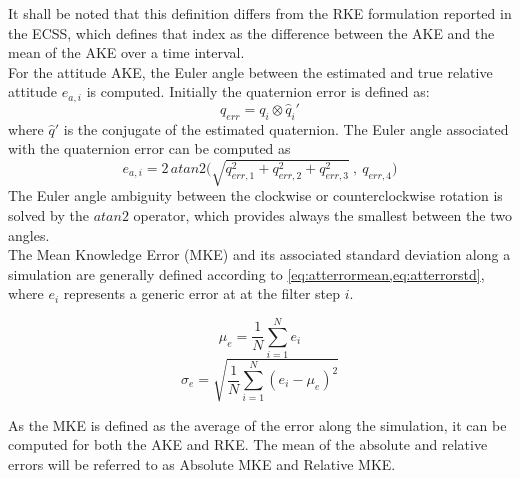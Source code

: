 It shall be noted that this definition differs from the RKE formulation reported in the ECSS, which defines that index as the difference between the AKE and the mean of the AKE over a time interval. \\
For the attitude AKE, the Euler angle between the estimated and true relative attitude $e_{a,i}$ is computed. Initially the quaternion error is defined as:
\begin{equation}
    q_{err} = q_i \otimes \hat{q}_i'
\end{equation}
where $\hat{q}'$ is the conjugate of the estimated quaternion. The Euler angle associated with the quaternion error can be computed as
\begin{equation}
    e_{a,i} = 2\, atan2\Big(\sqrt{q_{err,1}^2 + q_{err,2}^2 + q_{err,3}^2}\ , \ q_{err,4}\Big)
\end{equation}
The Euler angle ambiguity between the clockwise or counterclockwise rotation is solved by the $atan2$ operator, which provides always the smallest between the two angles. \\
The Mean Knowledge Error (MKE) and its associated standard deviation along a simulation are generally defined according to \cref{eq:atterrormean,eq:atterrorstd}, where $e_i$ represents a generic error at at the filter step $i$.

\begin{equation}
\label{eq:atterrormean}
    \mu_{e} = \dfrac{1}{N}\sum_{i=1}^N e_{i}
\end{equation}
\begin{equation}
\label{eq:atterrorstd}
    \sigma_{e} = \sqrt{\dfrac{1}{N}\sum_{i=1}^N (e_{i} -  \mu_{e})^2}
\end{equation}

As the MKE is defined as the average of the error along the simulation, it can be computed for both the AKE and RKE. The mean of the absolute and relative errors will be referred to as Absolute MKE and Relative MKE. 